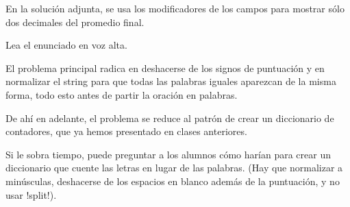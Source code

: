 \documentclass[10pt]{article}
\begin{document}
  En la solución adjunta,
  se usa los modificadores de los campos
  para mostrar sólo dos decimales del promedio final.


  Lea el enunciado en voz alta.

  El problema principal radica en deshacerse de los signos de puntuación
  y en normalizar el string para que todas las palabras iguales
  aparezcan de la misma forma, todo esto antes de partir la oración en palabras.

  De ahí en adelante,
  el problema se reduce al patrón de crear un diccionario de contadores,
  que ya hemos presentado en clases anteriores.

  Si le sobra tiempo,
  puede preguntar a los alumnos cómo harían para crear un diccionario
  que cuente las letras en lugar de las palabras.
  (Hay que normalizar a minúsculas, deshacerse de los espacios en blanco
  además de la puntuación, y no usar \li!split!).
\end{document}
